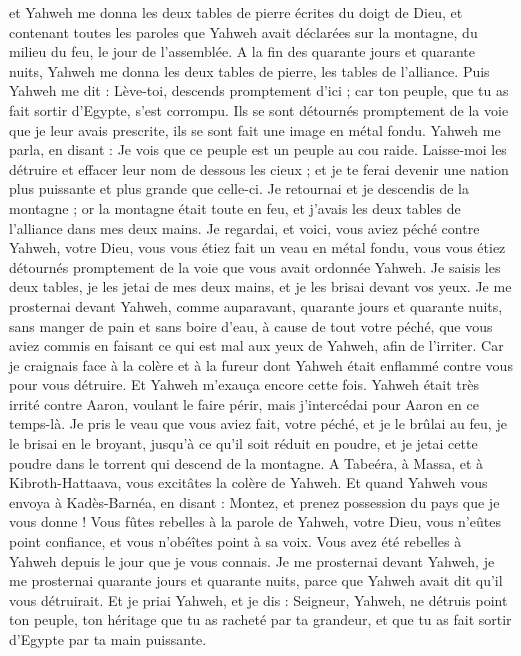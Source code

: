\begin{multicols}{2}
et Yahweh me donna les deux tables de pierre écrites du doigt de Dieu, et contenant toutes les paroles que Yahweh avait déclarées sur la montagne, du milieu du feu, le jour de l'assemblée.
A la fin des quarante jours et quarante nuits, Yahweh me donna les deux tables de pierre, les tables de l'alliance.
Puis Yahweh me dit : Lève-toi, descends promptement d'ici ; car ton peuple, que tu as fait sortir d'Egypte, s'est corrompu. Ils se sont détournés promptement de la voie que je leur avais prescrite, ils se sont fait une image en métal fondu.
Yahweh me parla, en disant : Je vois que ce peuple est un peuple au cou raide.
Laisse-moi les détruire et effacer leur nom de dessous les cieux ; et je te ferai devenir une nation plus puissante et plus grande que celle-ci.
Je retournai et je descendis de la montagne ; or la montagne était toute en feu, et j’avais les deux tables de l'alliance dans mes deux mains.
Je regardai, et voici, vous aviez péché contre Yahweh, votre Dieu, vous vous étiez fait un veau en métal fondu, vous vous étiez détournés promptement de la voie que vous avait ordonnée Yahweh.
Je saisis les deux tables, je les jetai de mes deux mains, et je les brisai devant vos yeux.
Je me prosternai devant Yahweh, comme auparavant, quarante jours et quarante nuits, sans manger de pain et sans boire d'eau, à cause de tout votre péché, que vous aviez commis en faisant ce qui est mal aux yeux de Yahweh, afin de l'irriter.
Car je craignais face à la colère et à la fureur dont Yahweh était enflammé contre vous pour vous détruire. Et Yahweh m'exauça encore cette fois.
Yahweh était très irrité contre Aaron, voulant le faire périr, mais j’intercédai pour Aaron en ce temps-là.
Je pris le veau\FTNT{} que vous aviez fait, votre péché, et je le brûlai au feu, je le brisai en le broyant, jusqu'à ce qu'il soit réduit en poudre, et je jetai cette poudre dans le torrent qui descend de la montagne.
A Tabeéra, à Massa, et à Kibroth-Hattaava, vous excitâtes la colère de Yahweh.
Et quand Yahweh vous envoya à Kadès-Barnéa, en disant : Montez, et prenez possession du pays que je vous donne ! Vous fûtes rebelles à la parole de Yahweh, votre Dieu, vous n’eûtes point confiance, et vous n'obéîtes point à sa voix.
Vous avez été rebelles à Yahweh depuis le jour que je vous connais.
Je me prosternai devant Yahweh, je me prosternai quarante jours et quarante nuits, parce que Yahweh avait dit qu'il vous détruirait.
Et je priai Yahweh, et je dis : Seigneur, Yahweh, ne détruis point ton peuple, ton héritage que tu as racheté par ta grandeur, et que tu as fait sortir d'Egypte par ta main puissante.

\end{multicols}
